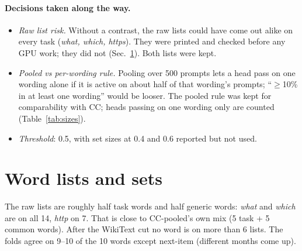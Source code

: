 \documentclass[10pt,a4paper]{article}
\begin{document}
\paragraph{Decisions taken along the way.}
\begin{itemize}
\item \emph{Raw list risk.} Without a contrast, the raw lists could have come out alike on every task (\emph{what, which, https}). They were printed and checked before any GPU work; they did not (Sec.~\ref{sec:sets}). Both lists were kept.
\item \emph{Pooled vs per-wording rule.} Pooling over 500 prompts lets a head pass on one wording alone if it is active on about half of that wording's prompts; ``$\geq$10\% in at least one wording'' would be looser. The pooled rule was kept for comparability with CC; heads passing on one wording only are counted (Table~\ref{tab:sizes}).
\item \emph{Threshold}: 0.5, with set sizes at 0.4 and 0.6 reported but not used.
\end{itemize}

\section{Word lists and sets}\label{sec:sets}

\begin{table}[H]\centering\scriptsize

\caption{Lists of fold 1; last column: words also in fold 2's lists (raw/clean). Removed WikiText words include \emph{which, what, http, https, mph, maybe, etc, instead, because}.}
\label{tab:lists}
\end{table}

The raw lists are roughly half task words and half generic words: \emph{what} and \emph{which} are on all 14, \emph{http} on 7. That is close to CC-pooled's own mix (5 task + 5 common words). After the WikiText cut no word is on more than 6 lists. The folds agree on 9--10 of the 10 words except next-item (different months come up).

\begin{table}[H]\centering\small
\resizebox{\linewidth}{!}{}
\caption{Heads per set (range over the two folds); median BOS attention of the unfiltered set; heads reaching 10\% on only one of the five wordings.}
\label{tab:sizes}
\end{table}
\end{document}
